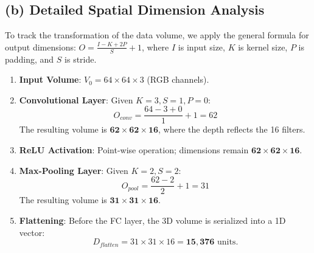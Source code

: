 \subsection*{(b) Detailed Spatial Dimension Analysis}
To track the transformation of the data volume, we apply the general formula for
output dimensions: $O = \frac{I - K + 2P}{S} + 1$, where $I$ is input size, $K$ is
kernel size, $P$ is padding, and $S$ is stride.
\begin{enumerate}
 \item \textbf{Input Volume}: $V_0 = 64 \times 64 \times 3$ (RGB channels).
 \item \textbf{Convolutional Layer}: Given $K=3, S=1, P=0$:
 \begin{equation*}
 O_{conv} = \frac{64 - 3 + 0}{1} + 1 = 62
 \end{equation*}
 The resulting volume is $\bm{62 \times 62 \times 16}$, where the depth reflects
the 16 filters.
 \item \textbf{ReLU Activation}: Point-wise operation; dimensions remain $\bm{62
\times 62 \times 16}$.
 \item \textbf{Max-Pooling Layer}: Given $K=2, S=2$:
 \begin{equation*}
 O_{pool} = \frac{62 - 2}{2} + 1 = 31
 \end{equation*}
 The resulting volume is $\bm{31 \times 31 \times 16}$.
 \item \textbf{Flattening}: Before the FC layer, the 3D volume is serialized into a 1D
vector:
 \begin{equation*}
 D_{flatten} = 31 \times 31 \times 16 = \bm{15,376} \text{ units.}
 \end{equation*}
\end{enumerate}
